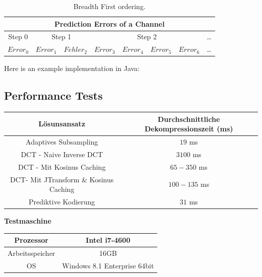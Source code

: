 \begin{table}[!htbp]
	\center
	\begin{tabular}{|c||c|c||c|c|c|c||c}
		\hline
		\multicolumn{8}{|c|}{Prediction Errors of a Channel}\\\hline\hline
		 Step 0& \multicolumn{2}{|c||}{Step 1} & \multicolumn{4}{|c||}{Step 2} &\ldots \\\hline
		$Error_0$ & $Error_1$ &$Fehler_2$ &$Error_3$ & $Error_4$ & $Error_5$ & $Error_6$   & \ldots \\\hline
	\end{tabular}
	\caption{Breadth First ordering.}
	\label{anhang:prediction:breath}
\end{table}
\pagebreak
Here is an example implementation in Java:

\pagebreak

\subsection{Performance Tests} \label{anhang:performance}
\begin{table}[!htbp]
\center
\begin{tabular}{c|c}
	Lösunsansatz & Durchschnittliche Dekompressionszeit (ms) \\\hline
	Adaptives Subsampling & $19$ ms \\
	DCT - Naive Inverse DCT & $3100$ ms \\
	DCT - Mit Kosinus Caching & $65-350$ ms\\
	DCT- Mit JTransform \& Kosinus Caching & $100-135$ ms\\
	Prediktive Kodierung & $31$ ms\\
\end{tabular}
\end{table}

\textbf{Testmaschine}
\begin{table}[!htbp]
\center
\begin{tabular}{c|c}
	Prozessor & Intel i7-4600 \\\hline
	Arbeitsspeicher & 16GB \\
	OS & Windows 8.1 Enterprise 64bit \\
\end{tabular}
\end{table}
